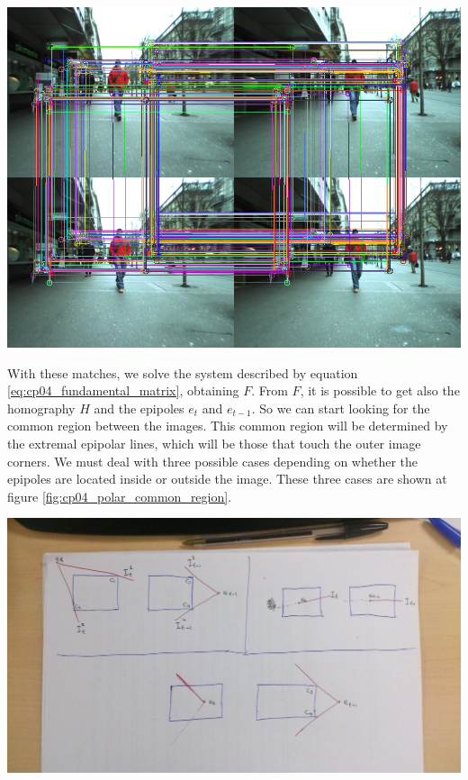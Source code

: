 \begin{center}
\includegraphics{fundamentalMatrixComputation}
\label{fig:cp04_polar_fund_matrix_computation}
\end{center}

With these matches, we solve the system described by equation \ref{eq:cp04_fundamental_matrix}, obtaining $F$. From $F$, it is possible to get also the homography $H$ and the epipoles $e_t$ and $e_{t-1}$. So we can start looking for the common region between the images. This common region will be determined by the extremal epipolar lines, which will be those that touch the outer image corners. We must deal with three possible cases depending on
whether the epipoles are located inside or outside the image. These three cases are shown at figure \ref{fig:cp04_polar_common_region}.

\begin{center}
\includegraphics{polar_common_region}
\label{fig:cp04_polar_common_region}
\end{center}

